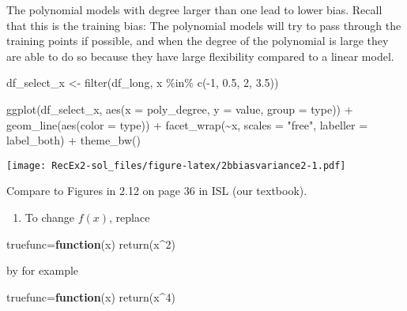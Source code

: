 \documentclass[
]{article}
\newenvironment{Shaded}{\begin{snugshade}}{\end{snugshade}}
\newcommand{\AttributeTok}[1]{\textcolor[rgb]{0.77,0.63,0.00}{#1}}
\newcommand{\ControlFlowTok}[1]{\textcolor[rgb]{0.13,0.29,0.53}{\textbf{#1}}}
\newcommand{\DecValTok}[1]{\textcolor[rgb]{0.00,0.00,0.81}{#1}}
\newcommand{\FloatTok}[1]{\textcolor[rgb]{0.00,0.00,0.81}{#1}}
\newcommand{\FunctionTok}[1]{\textcolor[rgb]{0.00,0.00,0.00}{#1}}
\newcommand{\NormalTok}[1]{#1}
\newcommand{\OtherTok}[1]{\textcolor[rgb]{0.56,0.35,0.01}{#1}}
\newcommand{\SpecialCharTok}[1]{\textcolor[rgb]{0.00,0.00,0.00}{#1}}
\newcommand{\StringTok}[1]{\textcolor[rgb]{0.31,0.60,0.02}{#1}}
\providecommand{\tightlist}{%
  \setlength{\itemsep}{0pt}\setlength{\parskip}{0pt}}
\begin{document}
The polynomial models with degree larger than one lead to lower bias.
Recall that this is the training bias: The polynomial models will try to
pass through the training points if possible, and when the degree of the
polynomial is large they are able to do so because they have large
flexibility compared to a linear model.

\begin{Shaded}
\begin{Highlighting}[]
\NormalTok{df\_select\_x }\OtherTok{\textless{}{-}} \FunctionTok{filter}\NormalTok{(df\_long, x }\SpecialCharTok{\%in\%} \FunctionTok{c}\NormalTok{(}\SpecialCharTok{{-}}\DecValTok{1}\NormalTok{, }\FloatTok{0.5}\NormalTok{, }\DecValTok{2}\NormalTok{, }\FloatTok{3.5}\NormalTok{))}

\FunctionTok{ggplot}\NormalTok{(df\_select\_x, }\FunctionTok{aes}\NormalTok{(}\AttributeTok{x =}\NormalTok{ poly\_degree, }\AttributeTok{y =}\NormalTok{ value, }\AttributeTok{group =}\NormalTok{ type)) }\SpecialCharTok{+}
  \FunctionTok{geom\_line}\NormalTok{(}\FunctionTok{aes}\NormalTok{(}\AttributeTok{color =}\NormalTok{ type)) }\SpecialCharTok{+}
  \FunctionTok{facet\_wrap}\NormalTok{(}\SpecialCharTok{\textasciitilde{}}\NormalTok{x, }\AttributeTok{scales =} \StringTok{"free"}\NormalTok{, }\AttributeTok{labeller =}\NormalTok{ label\_both) }\SpecialCharTok{+}
  \FunctionTok{theme\_bw}\NormalTok{()}
\end{Highlighting}
\end{Shaded}

\texttt{[image: RecEx2-sol\_files/figure-latex/2bbiasvariance2-1.pdf]}

Compare to Figures in 2.12 on page 36 in ISL (our textbook).

\begin{enumerate}
\def\labelenumi{\alph{enumi})}
\setcounter{enumi}{3}
\tightlist
\item
  To change \(f(x)\), replace
\end{enumerate}

\begin{Shaded}
\begin{Highlighting}[]
\NormalTok{truefunc}\OtherTok{=}\ControlFlowTok{function}\NormalTok{(x) }\FunctionTok{return}\NormalTok{(x}\SpecialCharTok{\^{}}\DecValTok{2}\NormalTok{)}
\end{Highlighting}
\end{Shaded}

by for example

\begin{Shaded}
\begin{Highlighting}[]
\NormalTok{truefunc}\OtherTok{=}\ControlFlowTok{function}\NormalTok{(x) }\FunctionTok{return}\NormalTok{(x}\SpecialCharTok{\^{}}\DecValTok{4}\NormalTok{)}
\end{Highlighting}
\end{Shaded}
\end{document}
